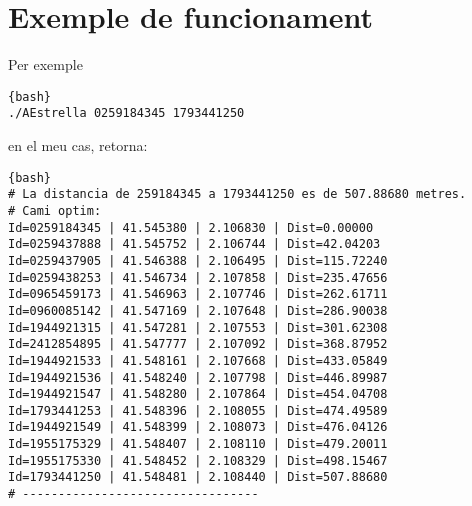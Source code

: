 \documentclass[a4paper, 12pt]{article}
\begin{document}
    \section{Exemple de funcionament}
    Per exemple
    \begin{lstlisting}{bash}
./AEstrella 0259184345 1793441250
    \end{lstlisting}
    en el meu cas, retorna:
    \begin{lstlisting}{bash}
# La distancia de 259184345 a 1793441250 es de 507.88680 metres.
# Cami optim:
Id=0259184345 | 41.545380 | 2.106830 | Dist=0.00000
Id=0259437888 | 41.545752 | 2.106744 | Dist=42.04203
Id=0259437905 | 41.546388 | 2.106495 | Dist=115.72240
Id=0259438253 | 41.546734 | 2.107858 | Dist=235.47656
Id=0965459173 | 41.546963 | 2.107746 | Dist=262.61711
Id=0960085142 | 41.547169 | 2.107648 | Dist=286.90038
Id=1944921315 | 41.547281 | 2.107553 | Dist=301.62308
Id=2412854895 | 41.547777 | 2.107092 | Dist=368.87952
Id=1944921533 | 41.548161 | 2.107668 | Dist=433.05849
Id=1944921536 | 41.548240 | 2.107798 | Dist=446.89987
Id=1944921547 | 41.548280 | 2.107864 | Dist=454.04708
Id=1793441253 | 41.548396 | 2.108055 | Dist=474.49589
Id=1944921549 | 41.548399 | 2.108073 | Dist=476.04126
Id=1955175329 | 41.548407 | 2.108110 | Dist=479.20011
Id=1955175330 | 41.548452 | 2.108329 | Dist=498.15467
Id=1793441250 | 41.548481 | 2.108440 | Dist=507.88680
# ---------------------------------
    \end{lstlisting}
\end{document}
